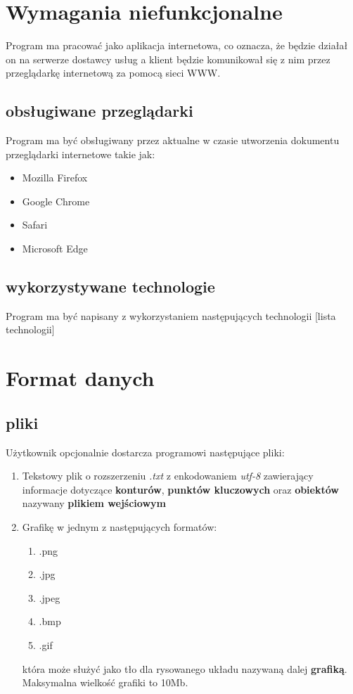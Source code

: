 \documentclass[hidelinks,10pt,a4paper]{article}
\newcommand\tab[1][0.5cm]{\hspace*{#1}}
\begin{document}
\section{Wymagania niefunkcjonalne}
\tab Program ma pracować jako aplikacja internetowa, co oznacza, że będzie działał on na serwerze dostawcy usług a klient będzie komunikował się z nim przez przeglądarkę internetową za pomocą sieci WWW.
\subsection{obsługiwane przeglądarki}
Program ma być obsługiwany przez aktualne w czasie utworzenia dokumentu  przeglądarki internetowe takie jak:
\begin{itemize}
\item Mozilla Firefox
\item Google Chrome
\item Safari
\item Microsoft Edge
\end{itemize}  
\subsection{wykorzystywane technologie}
Program ma być napisany z wykorzystaniem następujących technologii [lista technologii]




\section{Format danych}
\label{sec:daneWej}

\subsection{pliki}
Użytkownik opcjonalnie dostarcza programowi następujące pliki:
\begin{enumerate}
\item Tekstowy plik o rozszerzeniu \textit{.txt} z enkodowaniem \textit{utf-8} zawierający informacje dotyczące \textbf{konturów}, \textbf{punktów kluczowych} oraz \textbf{obiektów} nazywany \textbf{plikiem wejściowym}
\item Grafikę w jednym z następujących formatów: 
\begin{enumerate}
\item .png
\item .jpg
\item .jpeg
\item .bmp
\item .gif
\end{enumerate}
która może służyć jako tło dla rysowanego układu nazywaną dalej   \textbf{grafiką}.
Maksymalna wielkość grafiki to 10Mb.
\end{enumerate}
\end{document}
